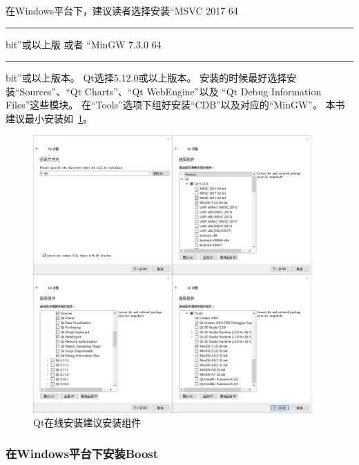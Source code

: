 在Windows平台下，建议读者选择安装“MSVC 2017 64\hspace{0.05em}\rule[0.7ex]{0.4em}{0.65pt}\hspace{0.05em}bit”或以上版
或者
“MinGW 7.3.0 64\hspace{0.05em}\rule[0.7ex]{0.4em}{0.65pt}\hspace{0.05em}bit”或以上版本。
Qt选择5.12.0或以上版本。
安装的时候最好选择安装“Sources”、“Qt Charts”、“Qt WebEngine”以及
“Qt Debug Information Files”这些模块。
在“Tools”选项下组好安装“CDB”以及对应的“MinGW”。
本书建议最小安装如\figurename\ \ref{p000001}。
\begin{figure}[htb] %
\marginnote{\fbox{\scriptsize{\kaishu\figurename\,}\footnotesize{\ref{p000001}}}}\centering %
\includegraphics[width=0.95\textwidth]{chapter01/images/windows_qt_online_install.png} %
\caption{Qt在线安装建议安装组件} %
\label{p000001} %
\end{figure}


\FloatBarrier
\subsubsection{
在Windows平台下安装Boost
}\label{ss000210}

